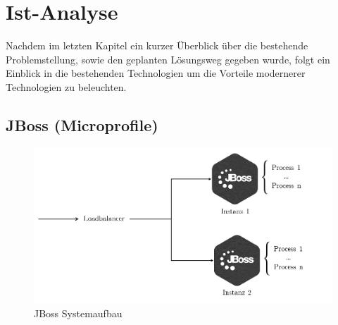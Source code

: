 \chapter{Ist-Analyse \checkmark \checkmark}

Nachdem im letzten Kapitel ein kurzer Überblick über die bestehende Problemstellung, sowie den geplanten Lösungsweg gegeben wurde, folgt ein Einblick in die bestehenden Technologien um die Vorteile modernerer Technologien zu beleuchten. 

\section{JBoss (Microprofile) \checkmark \checkmark}



\begin{figure}[b!]
	\centering
	\includegraphics[width=.7\linewidth]{kapitel/ist-analyse/_img/jbossOverview}
	\caption[JBoss Systemaufbau]{JBoss Systemaufbau}
	\label{fig:jbossArch}
\end{figure}


